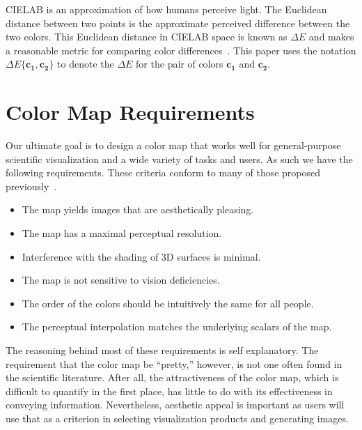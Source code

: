 \documentclass{llncs}
\newcommand{\Lab}{CIELAB\xspace}
\newcommand{\DeltaE}{\ensuremath{\Delta{}E}\xspace}
\newcommand*{\cvec}[1]{\mathbf{#1}}
\begin{document}
\Lab is an approximation of how humans perceive light.  The Euclidean
distance between two points is the approximate perceived difference between
the two colors.  This Euclidean distance in \Lab space is known as \DeltaE
and makes a reasonable metric for comparing color differences~\cite{Wyszecki82}.
This paper uses the notation $\DeltaE\{\cvec{c_1},\cvec{c_2}\}$ to denote
the \DeltaE for the pair of colors $\cvec{c_1}$ and $\cvec{c_2}$.


\section{Color Map Requirements}
\label{sec:ColorMapRequirements}

Our ultimate goal is to design a color map that works well for
general-purpose scientific visualization and a wide
variety of tasks and users.  As such we have the following requirements.
These criteria conform to many of those proposed
previously~\cite{Fortner97,Levkowitz92,Light04}.

\begin{itemize}
\item The map yields images that are aesthetically pleasing.
\item The map has a maximal perceptual resolution.
\item Interference with the shading of 3D surfaces is minimal.
\item The map is not sensitive to vision deficiencies.
\item The order of the colors should be intuitively the same for all
  people.
\item The perceptual interpolation matches the underlying scalars of the map.
\end{itemize}

The reasoning behind most of these requirements is self explanatory.  The
requirement that the color map be ``pretty,'' however, is not one often
found in the scientific literature.  After all, the attractiveness of the
color map, which is difficult to quantify in the first place, has little to
do with its effectiveness in conveying information.  Nevertheless, aesthetic
appeal is important as users will use that as a criterion in selecting
visualization products and generating images.

\end{document}
